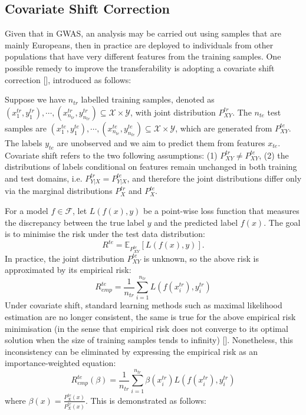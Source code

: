 \documentclass[a4paper,12pt]{article}
\begin{document}
%
%
%
%
%
%
\subsection{Covariate Shift Correction} \label{Covariate Shift Correction}
Given that in GWAS, an analysis may be carried out using samples that are mainly Europeans, then in practice are deployed to individuals from other populations that have very different features from the training samples. One possible remedy to improve the transferability is adopting a covariate shift correction [\cite{shimodaira2000improving}], introduced as follows:

Suppose we have $n_{tr}$ labelled training samples, denoted as $(x_{1}^{tr},y_{1}^{tr}), \cdots, (x_{n_{tr}}^{tr},y_{n_{tr}}^{tr}) \subseteq \mathcal{X} \times \mathcal{Y}$, with joint distribution $P_{XY}^{tr}$. The $n_{te}$ test samples are $(x_{1}^{te},y_{1}^{te}), \cdots, (x_{n_{te}}^{te},y_{n_{te}}^{te}) \subseteq \mathcal{X} \times \mathcal{Y}$, which are generated from $P_{XY}^{te}$. The labels $y_{te}$ are unobserved and we aim to predict them from features $x_{te}$. Covariate shift refers to the two following assumptions: (1) $P_{XY}^{tr} \neq P_{XY}^{te}$, (2) the distributions of labels conditional on features remain unchanged in both training and test domains, i.e.  $P_{Y|X}^{tr} = P_{Y|X}^{te}$, and therefore the joint distributions differ only via the marginal distributions $P_{X}^{tr}$ and $P_{X}^{te}$.

For a model $f \in \mathcal{F}$, let $L(f(x), y)$ be a point-wise loss function that measures the discrepancy between the true label $y$ and the predicted label $f(x)$. The goal is to minimise the risk under the test data distribution:
\begin{equation*}
    R^{te} = \mathbb{E}_{P^{te}_{XY}}[L(f(x), y)]   \text{.}
\end{equation*}
In practice, the joint distribution $P^{te}_{XY}$ is unknown, so the above risk is approximated by its empirical risk:
\begin{equation*}
    R^{te}_{emp} = \frac{1}{n_{tr}} \sum_{i = 1}^{n_{tr}}L(f(x_{i}^{tr}), y_{i}^{tr})
\end{equation*}
Under covariate shift, standard learning methods such as maximal likelihood estimation are no longer consistent, the same is true for the above empirical risk minimisation (in the sense that empirical risk does not converge to its optimal solution when the size of training samples tends to infinity) [\cite{shimodaira2000improving}]. Nonetheless, this inconsistency can be eliminated by expressing the empirical risk as an importance-weighted equation:
\begin{equation*}
    R^{te}_{emp}(\beta) = \frac{1}{n_{tr}} \sum_{i = 1}^{n_{tr}} \beta(x_{i}^{tr}) L(f(x_{i}^{tr}), y_{i}^{tr})
\end{equation*}
where $\beta(x) = \frac{P^{te}_{X}(x)}{P^{tr}_{X}(x)}$. This is demonstrated as follows:
\end{document}
